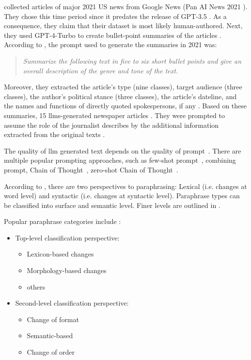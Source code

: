 \citet{ayele_overview_2024,bevendorff_overview_2024} collected articles of major 2021 US news from Google News (Pan AI News 2021 \citep{bevendorff_overview_2024}).
They chose this time period since it predates the release of GPT-3.5 \citep{bevendorff_overview_2024,ayele_overview_2024}.
As a consequence, they claim that their dataset is most likely human-authored.
Next, they used GPT-4-Turbo to create bullet-point summaries of the articles \citep{bevendorff_overview_2024,ayele_overview_2024}. 
According to \citet{bevendorff_overview_2024}, the prompt used to generate the summaries in 2021 was:
\begin{quote}
    \textit{Summarize the following text in five to six short bullet points and give an overall description
    of the genre and tone of the text.}
\end{quote}
Moreover, they extracted the article's type (nine classes), target audience (three classes), the author's political stance (three classes), the article's dateline, 
and the names and functions of directly quoted spokespersons, if any \citep{bevendorff_overview_2024}.
Based on these summaries, 15 \acp{llm}-generated newspaper articles \citep{ayele_overview_2024}.
They were prompted to assume the role of the journalist describes by the additional information extracted from the original texts \citep{bevendorff_overview_2024}.


The quality of \ac{llm} generated text depends on the quality of prompt~\citep{Wu_ODD_challenges_2025}.
There are multiple popular prompting approaches, such as few-shot prompt~\citep{brown_few_shot_prompting_2020}, combining prompt, Chain of Thought~\citep{Wei_CoT_2022}, zero-shot Chain of Thought~\citep{kojima_zeroshot_2022}.

According to \citet{gohsen_task_oriented_2024}, there are two perspectives to paraphrasing: 
Lexical (i.e. changes at word level) and syntactic (i.e. changes at syntactic level).
Paraphrase types can be classified into surface and semantic level. Finer levels are outlined in \citep{gohsen_task_oriented_2024}.

Popular paraphrase categories include \citep{fu_learning_2024}:
\begin{itemize}
    \item Top-level classification perspective: 
        \begin{itemize}
            \item Lexicon-based changes
            \item Morphology-based changes
            \item others
        \end{itemize}
    \item Second-level classification perspective:
        \begin{itemize}
            \item Change of format
            \item Semantic-based
            \item Change of order
        \end{itemize}
\end{itemize}


